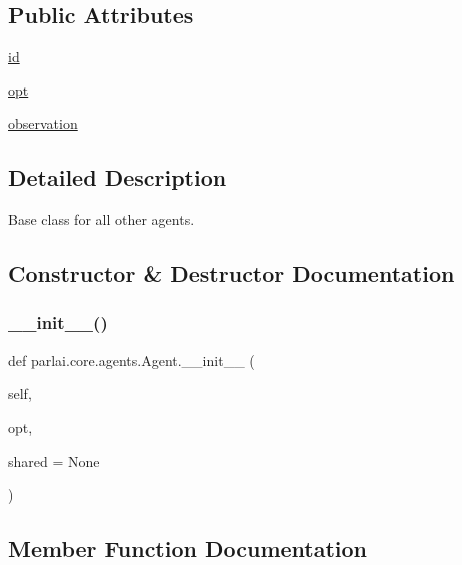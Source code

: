 \subsection*{Public Attributes}
\begin{DoxyCompactItemize}
\item 
\hyperlink{classparlai_1_1core_1_1agents_1_1Agent_ac00c13f4c7dd1263bf9203fa96dd2366}{id}
\item 
\hyperlink{classparlai_1_1core_1_1agents_1_1Agent_ab3b45d2754244608c75d4068b90cd051}{opt}
\item 
\hyperlink{classparlai_1_1core_1_1agents_1_1Agent_aedbecc4b4aa7af7413882a0429e0f1db}{observation}
\end{DoxyCompactItemize}


\subsection{Detailed Description}
\begin{DoxyVerb}Base class for all other agents.
\end{DoxyVerb}
 

\subsection{Constructor \& Destructor Documentation}
\mbox{\label{classparlai_1_1core_1_1agents_1_1Agent_aa7992ab392e2803607937e805ceb176f}} 
\subsubsection{\texorpdfstring{\+\_\+\+\_\+init\+\_\+\+\_\+()}{\_\_init\_\_()}}
{\footnotesize\ttfamily def parlai.\+core.\+agents.\+Agent.\+\_\+\+\_\+init\+\_\+\+\_\+ (\begin{DoxyParamCaption}\item[{}]{self,  }\item[{}]{opt,  }\item[{}]{shared = {\ttfamily None} }\end{DoxyParamCaption})}



\subsection{Member Function Documentation}
\mbox{\label{classparlai_1_1core_1_1agents_1_1Agent_a6a8abe0a98dd59bc39c9f12b163072db}} 
